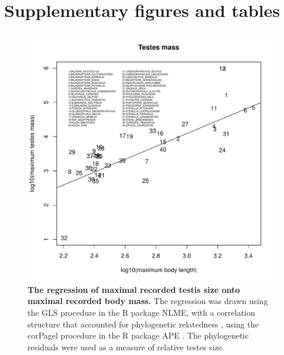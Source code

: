 \documentclass[12pt]{article}
\begin{document}



\clearpage

\section*{Supplementary figures and tables}


\begin{figure}
\begin{center}
  \includegraphics[width=\textwidth]{S1}
\end{center}
\caption{
\textbf{The regression of maximal recorded testis size onto maximal recorded body mass.} 
The regression was drawn using the GLS procedure in the R package NLME,
with a correlation structure that accounted for phylogenetic relatedness \citep{pagel1999}, using the corPagel
procedure in the R package APE \citep{paradis2004}. The phylogenetic residuals were used as a measure of relative
testes size.
}
\end{figure}
\end{document}

